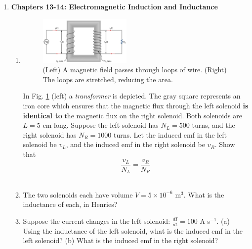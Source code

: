 \documentclass[10pt]{article}
\begin{document}
\begin{enumerate}
\item \textbf{Chapters 13-14: Electromagnetic Induction and Inductance}
\begin{enumerate}
\item 
\begin{figure}
\centering
\includegraphics[width=0.45\textwidth]{transformer.png}
\caption{\label{fig:trans} (Left) A magnetic field passes through loops of wire.  (Right) The loops are stretched, reducing the area.}
\end{figure}
In Fig. \ref{fig:trans} (left) a \textit{transformer} is depicted.  The gray square represents an iron core which ensures that the magnetic flux through the left solenoid \textbf{is identical to} the magnetic flux on the right solenoid.  Both solenoids are $L = 5$ cm long.  Suppose the left solenoid has $N_L = 500$ turns, and the right solenoid has $N_R = 1000$ turns.  Let the induced emf in the left solenoid be $v_L$, and the induced emf in the right solenoid be $v_R$.  Show that
\begin{equation}
\frac{v_L}{N_L} = \frac{v_R}{N_R}
\end{equation} \\ \vspace{3cm}
\item The two solenoids each have volume $V = 5 \times 10^{-6}$ m$^3$.  What is the inductance of each, in Henries? \\ \vspace{3cm}
\item Suppose the current changes in the left solenoid: $\frac{dI}{dt} = 100$ A s$^{-1}$.  (a) Using the inductance of the left solenoid, what is the induced emf in the left solenoid? (b) What is the induced emf in the right solenoid? \\ \vspace{4cm}
\end{enumerate}
\end{enumerate}
\end{document}

